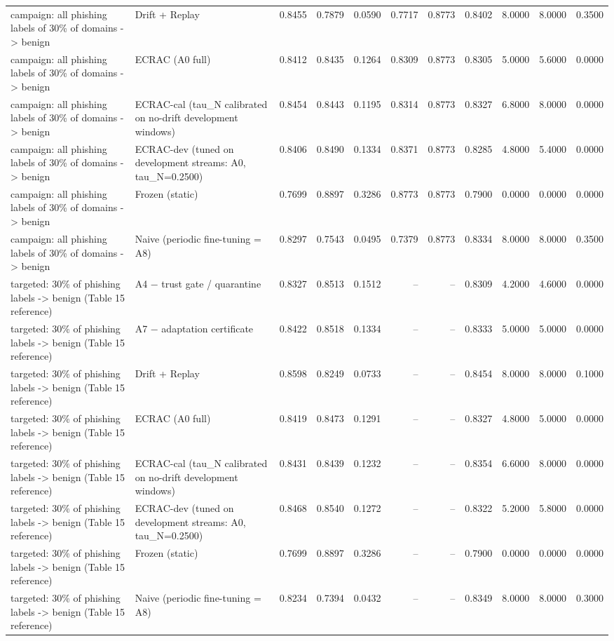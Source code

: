 \begin{table}[t]
\begin{tabular}{llrrrrrrrrr}
campaign: all phishing labels of 30\% of domains -> benign & Drift + Replay & 0.8455 & 0.7879 & 0.0590 & 0.7717 & 0.8773 & 0.8402 & 8.0000 & 8.0000 & 0.3500 \\
campaign: all phishing labels of 30\% of domains -> benign & ECRAC (A0 full) & 0.8412 & 0.8435 & 0.1264 & 0.8309 & 0.8773 & 0.8305 & 5.0000 & 5.6000 & 0.0000 \\
campaign: all phishing labels of 30\% of domains -> benign & ECRAC-cal (tau\_N calibrated on no-drift development windows) & 0.8454 & 0.8443 & 0.1195 & 0.8314 & 0.8773 & 0.8327 & 6.8000 & 8.0000 & 0.0000 \\
campaign: all phishing labels of 30\% of domains -> benign & ECRAC-dev (tuned on development streams: A0, tau\_N=0.2500) & 0.8406 & 0.8490 & 0.1334 & 0.8371 & 0.8773 & 0.8285 & 4.8000 & 5.4000 & 0.0000 \\
campaign: all phishing labels of 30\% of domains -> benign & Frozen (static) & 0.7699 & 0.8897 & 0.3286 & 0.8773 & 0.8773 & 0.7900 & 0.0000 & 0.0000 & 0.0000 \\
campaign: all phishing labels of 30\% of domains -> benign & Naive (periodic fine-tuning = A8) & 0.8297 & 0.7543 & 0.0495 & 0.7379 & 0.8773 & 0.8334 & 8.0000 & 8.0000 & 0.3500 \\
targeted: 30\% of phishing labels -> benign (Table 15 reference) & A4 − trust gate / quarantine & 0.8327 & 0.8513 & 0.1512 & -- & -- & 0.8309 & 4.2000 & 4.6000 & 0.0000 \\
targeted: 30\% of phishing labels -> benign (Table 15 reference) & A7 − adaptation certificate & 0.8422 & 0.8518 & 0.1334 & -- & -- & 0.8333 & 5.0000 & 5.0000 & 0.0000 \\
targeted: 30\% of phishing labels -> benign (Table 15 reference) & Drift + Replay & 0.8598 & 0.8249 & 0.0733 & -- & -- & 0.8454 & 8.0000 & 8.0000 & 0.1000 \\
targeted: 30\% of phishing labels -> benign (Table 15 reference) & ECRAC (A0 full) & 0.8419 & 0.8473 & 0.1291 & -- & -- & 0.8327 & 4.8000 & 5.0000 & 0.0000 \\
targeted: 30\% of phishing labels -> benign (Table 15 reference) & ECRAC-cal (tau\_N calibrated on no-drift development windows) & 0.8431 & 0.8439 & 0.1232 & -- & -- & 0.8354 & 6.6000 & 8.0000 & 0.0000 \\
targeted: 30\% of phishing labels -> benign (Table 15 reference) & ECRAC-dev (tuned on development streams: A0, tau\_N=0.2500) & 0.8468 & 0.8540 & 0.1272 & -- & -- & 0.8322 & 5.2000 & 5.8000 & 0.0000 \\
targeted: 30\% of phishing labels -> benign (Table 15 reference) & Frozen (static) & 0.7699 & 0.8897 & 0.3286 & -- & -- & 0.7900 & 0.0000 & 0.0000 & 0.0000 \\
targeted: 30\% of phishing labels -> benign (Table 15 reference) & Naive (periodic fine-tuning = A8) & 0.8234 & 0.7394 & 0.0432 & -- & -- & 0.8349 & 8.0000 & 8.0000 & 0.3000 \\
\bottomrule
\end{tabular}
\end{table}